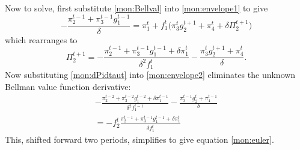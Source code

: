 Now to solve, first substitute \eqref{mon:Bellval} into
\eqref{mon:envelope1} to give
\begin{equation}
    - \frac{\pi^{t-1}_2 + \pi^{t-1}_3 g^{t-1}_1}{\delta} = \pi^t_1 + f^t_1 \bigl( \pi^t_3 g^{t+1}_2  + \pi^t_4 + \delta
    \Pi^{t+1}_2 \bigr)
\end{equation}
which rearranges to
\begin{equation}    \label{mon:dPidtaut}
    \Pi^{t+1}_2 = - \frac{\pi^{t-1}_2 + \pi^{t-1}_3 g^{t-1}_1 + \delta \pi^t_1}{\delta^2 f^t_1}
    - \frac{\pi^t_3 g^{t+1}_2 + \pi^t_4}{\delta}.
\end{equation}
Now substituting \eqref{mon:dPidtaut} into \eqref{mon:envelope2}
eliminates the unknown Bellman value function derivative:
\begin{multline}
    - \frac{\pi^{t-2}_2 + \pi^{t-2}_3 g^{t-2}_1 + \delta \pi^{t-1}_1}{\delta^2 f^{t-1}_1}
    - \frac{\pi^{t-1}_3 g^t_2 + \pi^{t-1}_4}{\delta}  \\ =
    - f^t_2 \frac{\pi^{t-1}_2 + \pi^{t-1}_3 g^{t-1}_1 + \delta
\pi^t_1}{\delta f^t_1}
\end{multline}
This, shifted forward two periods, simplifies to give equation
\eqref{mon:euler}.

